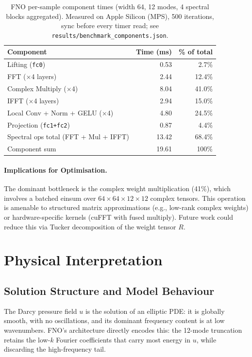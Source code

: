 \documentclass[11pt,a4paper]{article}
\begin{document}
\begin{table}[H]
\centering
\caption{FNO per-sample component times (width 64, 12 modes, 4 spectral blocks aggregated). Measured on Apple Silicon (MPS), 500 iterations, sync before every timer read; see \texttt{results/benchmark\_components.json}.}
\begin{tabular}{lrr}
\toprule
Component & Time (ms) & \% of total \\
\midrule
Lifting (\texttt{fc0})               & 0.53 & 2.7\% \\
FFT ($\times$4 layers)               & 2.44 & 12.4\% \\
Complex Multiply ($\times$4)         & 8.04 & 41.0\% \\
IFFT ($\times$4 layers)              & 2.94 & 15.0\% \\
Local Conv + Norm + GELU ($\times$4) & 4.80 & 24.5\% \\
Projection (\texttt{fc1+fc2})        & 0.87 & 4.4\% \\
\midrule
Spectral ops total (FFT + Mul + IFFT) & 13.42 & 68.4\% \\
Component sum                          & 19.61 & 100\% \\
\bottomrule
\end{tabular}
\end{table}

\paragraph{Implications for Optimisation.}
The dominant bottleneck is the complex weight multiplication (41\%), which involves a batched einsum over $64\times64\times12\times12$ complex tensors. This operation is amenable to structured matrix approximations (e.g., low-rank complex weights) or hardware-specific kernels (cuFFT with fused multiply). Future work could reduce this via Tucker decomposition of the weight tensor $R$.

\section{Physical Interpretation}

\subsection{Solution Structure and Model Behaviour}
The Darcy pressure field $u$ is the solution of an elliptic PDE: it is globally smooth, with no oscillations, and its dominant frequency content is at low wavenumbers. FNO's architecture directly encodes this: the 12-mode truncation retains the low-$k$ Fourier coefficients that carry most energy in $u$, while discarding the high-frequency tail.
\end{document}
